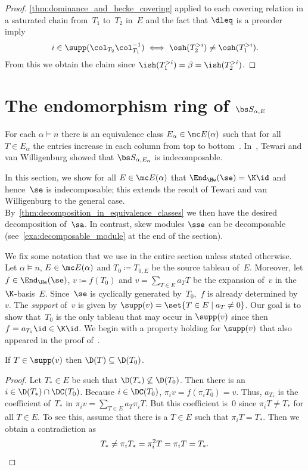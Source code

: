 \begin{proof}	 
	\cref{thm:dominance_and_hecke_covering} applied to each covering relation in a saturated chain from~$T_1$ to~$T_2$ in~$E$ and the fact that $\dleq$ is a preorder imply 
	\begin{align*}
		i\in \supp(\col_{T_2}\col^{-1}_{T_1}) \iff \osh(T_2^{>i}) \neq \osh(T_1^{>i}).
	\end{align*}
	From this we obtain the claim since $\ish(T^{>i}_1) = \beta = \ish(T^{>i}_2)$.
\end{proof}

\section{The endomorphism ring of \texorpdfstring{$\bs S_{\alpha,E}$}{S\_a,E}}
\label{sec:endomorphism_ring_of_0-Hecke_modules}

 For each $\alpha \vDash n$ there is an equivalence class $E_\alpha\in \mc E(\alpha)$ such that for all $T \in E_\alpha$ the entries increase in each column from top to bottom~\cite[Section~8]{Tewari2015}. 
In~\cite{Tewari2015}, Tewari and van Willigenburg showed that $\bs S_{\alpha,E_\alpha}$ is indecomposable.

In this section, we show for all $E\in \mc E(\alpha)$ that $\End_{\He}(\se) = \K\id$ and hence~$\se$ is indecomposable; this extends the result of Tewari and van Willigenburg to the general case.
By~\cref{thm:decomposition_in_equivalence_classes} we then have the desired decomposition of~$\sa$.
In contrast, skew modules $\sse$ can be decomposable (see~\cref{exa:decomposable_module} at the end of the section).

We fix some notation that we use in the entire section unless stated otherwise.
Let $\alpha\vDash n$, $E\in \mc E(\alpha)$ and $T_0 \coloneqq T_{0,E}$ be the source tableau of~$E$.
Moreover, let $f\in \End_{\He}(\se)$, $v\coloneqq f(T_0)$ and $v = \sum_{T\in E} a_T T$ be the expansion of~$v$ in the $\K$-basis~$E$.
Since~$\se$ is cyclically generated by~$T_0$,~$f$ is already determined by~$v$.
The \emph{support} of~$v$ is given by $\supp(v)=\set{T\in E \mid a_T \neq 0}$.
Our goal is to show that~$T_0$ is the only tableau that may occur in $\supp(v)$ since then $f = a_{T_0} \id \in \K\id$.
We begin with a property holding for $\supp(v)$ that also appeared in the proof of~\cite[Theorem~7.8]{Tewari2015}.

\begin{lemma}
	\label{thm:descent_set_of_support_of_v}
	If $T\in \supp(v)$ then $\D(T) \subseteq \D(T_0)$.
\end{lemma}
\begin{proof} Let $T_*\in E$ be such that $\D(T_*)\not \subseteq \D(T_0)$. 
	Then there is an $i\in \D(T_*)\cap \DC(T_0)$. 
	 Because $i\in \DC(T_0)$, $\pi_i v = f(\pi_i T_0) = v$. Thus, $a_{T_*}$ is the coefficient of~$T_*$ in $\pi_i v = \sum_{T \in E} a_T \pi_i T$. But this coefficient is~$0$ since $\pi_iT \neq T_*$ for all $T\in E$. To see this, assume that there is a $T\in E$ such that $\pi_i T = T_*$. Then we obtain a contradiction as
	 \[
	 T_* \neq \pi_i T_* = \pi_i^2 T = \pi_i T = T_*. \qedhere
	 \]	
\end{proof}

